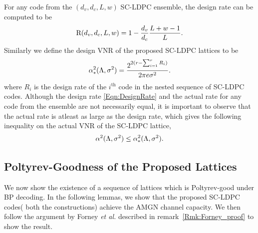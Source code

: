 \begin{remark}
For any code from the $(d_{v},d_{c},L,w)$ SC-LDPC ensemble, the design rate can be computed to be 
\begin{align}
\text{R}(d_{v},d_{c},L,w)=1-\frac{d_{v}}{d_{c}}\frac{L+w-1}{L}.
\label{Eqn:DesignRate}
\end{align}
Similarly we define the design VNR of the proposed SC-LDPC lattices to be 
\begin{align*}
\alpha^{2}_{*}(\Lambda,\sigma^{2})=\frac{2^{2(r-\sum_{i=1}^{r}R_{i})}}{2\pi e\sigma^{2}}.
\end{align*}
where $R_{i}$ is the design rate of the $i^{\text{th}}$ code in the nested sequence of SC-LDPC codes. Although the design rate \eqref{Eqn:DesignRate} and the actual rate for any code from the ensemble are not necessarily equal, it is important to observe that the actual rate is atleast as large as the design rate, which gives the following inequality on the actual VNR of the SC-LDPC lattice,
\begin{align}
\alpha^{2}(\Lambda,\sigma^{2})\leq \alpha^{2}_{*}(\Lambda,\sigma^{2}).
\label{Eqn:VNRInequality}
\end{align}
\end{remark}


\subsection{Poltyrev-Goodness of the Proposed Lattices}
We now show the existence of a sequence of lattices which is Poltyrev-good under BP decoding. In the following lemmas, we show that the proposed SC-LDPC codes( both the constructions) achieve the AMGN channel capacity. We then follow the argument by Forney \textit{et al.} described in remark~\ref{Rmk:Forney_proof} to show the result.


